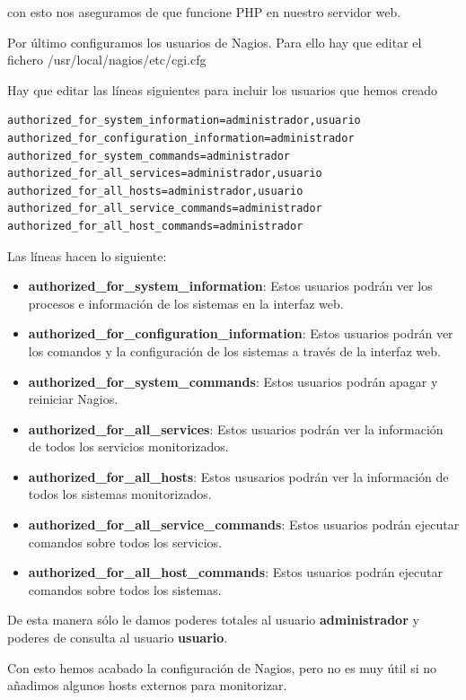 \documentclass[11pt,a4paper]{article}
\begin{document}
con esto nos aseguramos de que funcione PHP en nuestro servidor web.

Por último configuramos los usuarios de Nagios. Para ello hay que editar el fichero /usr/local/nagios/etc/cgi.cfg

Hay que editar las líneas siguientes para incluir los usuarios que hemos creado

\begin{verbatim}
authorized_for_system_information=administrador,usuario
authorized_for_configuration_information=administrador
authorized_for_system_commands=administrador
authorized_for_all_services=administrador,usuario
authorized_for_all_hosts=administrador,usuario
authorized_for_all_service_commands=administrador
authorized_for_all_host_commands=administrador
\end{verbatim}

Las líneas hacen lo siguiente:

\begin{itemize}
\item \textbf{authorized\_for\_system\_information}: Estos usuarios podrán ver los procesos e información de los sistemas en la interfaz web.
\item \textbf{authorized\_for\_configuration\_information}: Estos usuarios podrán ver los comandos y la configuración de los sistemas a través de la interfaz web.
\item \textbf{authorized\_for\_system\_commands}: Estos usuarios podrán apagar y reiniciar Nagios.
\item \textbf{authorized\_for\_all\_services}: Estos usuarios podrán ver la información de todos los servicios monitorizados.
\item \textbf{authorized\_for\_all\_hosts}: Estos ususarios podrán ver la información de todos los sistemas monitorizados.
\item \textbf{authorized\_for\_all\_service\_commands}: Estos usuarios podrán ejecutar comandos sobre todos los servicios.
\item \textbf{authorized\_for\_all\_host\_commands}: Estos usuarios podrán ejecutar comandos sobre todos los sistemas.
\end{itemize}

De esta manera sólo le damos poderes totales al usuario \textbf{administrador} y poderes de consulta al usuario \textbf{usuario}.

Con esto hemos acabado la configuración de Nagios, pero no es muy útil si no añadimos algunos hosts externos para monitorizar.
\end{document}
